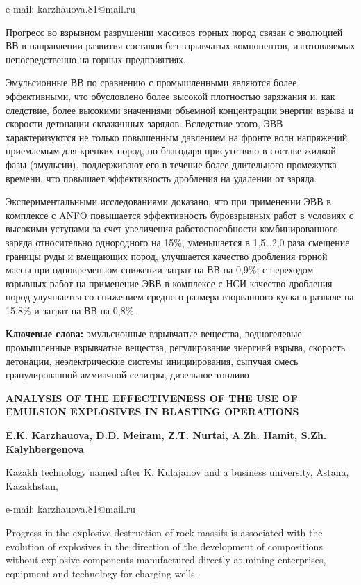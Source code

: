 e-mail: karzhauova.81@mail.ru

Прогресс во взрывном разрушении массивов горных пород связан с эволюцией
ВВ в направлении развития составов без взрывчатых компонентов,
изготовляемых непосредственно на горных предприятиях.

Эмульсионные ВВ по сравнению с промышленными являются более
эффективными, что обусловлено более высокой плотностью заряжания и, как
следствие, более высокими значениями объемной концентрации энергии
взрыва и скорости детонации скважинных зарядов. Вследствие этого, ЭВВ
характеризуются не только повышенным давлением на фронте волн
напряжений, приемлемым для крепких пород, но благодаря присутствию в
составе жидкой фазы (эмульсии), поддерживают его в течение более
длительного промежутка времени, что повышает эффективность дробления на
удалении от заряда.

Экспериментальными исследованиями доказано, что при применении ЭВВ в
комплексе с ANFO повышается эффективность буровзрывных работ в условиях
с высокими уступами за счет увеличения работоспособности
комбинированного заряда относительно однородного на 15\%, уменьшается в
1,5\ldots2,0 раза смещение границы руды и вмещающих пород, улучшается
качество дробления горной массы при одновременном снижении затрат на ВВ
на 0,9\%; с переходом взрывных работ на применение ЭВВ в комплексе с НСИ
качество дробления пород улучшается со снижением среднего размера
взорванного куска в развале на 15,8\% и затрат на ВВ на 0,8\%.

{\bfseries Ключевые слова:} эмульсионные взрывчатые вещества, водногелевые
промышленные взрывчатые вещества, регулирование энергией взрыва,
скорость детонации, неэлектрические системы инициирования, сыпучая смесь
гранулированной аммиачной селитры, дизельное топливо

{\bfseries ANALYSIS OF THE EFFECTIVENESS OF THE USE OF EMULSION EXPLOSIVES
IN BLASTING OPERATIONS}

{\bfseries E.K. Karzhauova, D.D. Meiram, Z.T. Nurtai, A.Zh. Hamit, S.Zh.
Kalyhbergenova}

Kazakh technology named after K. Kulajanov and a business university,
Astana, Kazakhstan,

e-mail: karzhauova.81@mail.ru

Progress in the explosive destruction of rock massifs is associated with
the evolution of explosives in the direction of the development of
compositions without explosive components manufactured directly at
mining enterprises, equipment and technology for charging wells.

